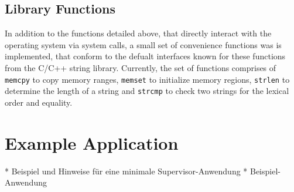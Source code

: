 \subsection{Library Functions} In addition to the functions detailed above, that
directly interact with the operating system via system calls, a small set of
convenience functions was is implemented, that conform to the defualt interfaces
known for these functions from the C/C++ string library. Currently, the set of
functions comprises of \texttt{memcpy} to copy memory ranges, \texttt{memset} to
initialize memory regions, \texttt{strlen} to determine the length of a string
and \texttt{strcmp} to check two strings for the lexical order and equality.







\section{Example Application}
* Beispiel und Hinweise für eine minimale Supervisor-Anwendung
* Beispiel-Anwendung

% 
% 


